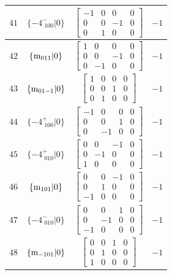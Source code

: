 \documentclass[fleqn,8pt]{jsarticle}
\begin{document}
\begin{longtable}{cccc}
$ 41 $ & $ \{-4^{-}_{\,\,100}|0\} $ & $ \begin{bmatrix} -1 & 0 & 0 & 0 \\ 0 & 0 & -1 & 0 \\ 0 & 1 & 0 & 0 \end{bmatrix} $ & $ -1 $ \\ \hline
$ 42 $ & $ \{{\rm m}_{011}|0\} $ & $ \begin{bmatrix} 1 & 0 & 0 & 0 \\ 0 & 0 & -1 & 0 \\ 0 & -1 & 0 & 0 \end{bmatrix} $ & $ -1 $ \\ \hline
$ 43 $ & $ \{{\rm m}_{01-1}|0\} $ & $ \begin{bmatrix} 1 & 0 & 0 & 0 \\ 0 & 0 & 1 & 0 \\ 0 & 1 & 0 & 0 \end{bmatrix} $ & $ -1 $ \\ \hline
$ 44 $ & $ \{-4^{+}_{\,\,100}|0\} $ & $ \begin{bmatrix} -1 & 0 & 0 & 0 \\ 0 & 0 & 1 & 0 \\ 0 & -1 & 0 & 0 \end{bmatrix} $ & $ -1 $ \\ \hline
$ 45 $ & $ \{-4^{+}_{\,\,010}|0\} $ & $ \begin{bmatrix} 0 & 0 & -1 & 0 \\ 0 & -1 & 0 & 0 \\ 1 & 0 & 0 & 0 \end{bmatrix} $ & $ -1 $ \\ \hline
$ 46 $ & $ \{{\rm m}_{101}|0\} $ & $ \begin{bmatrix} 0 & 0 & -1 & 0 \\ 0 & 1 & 0 & 0 \\ -1 & 0 & 0 & 0 \end{bmatrix} $ & $ -1 $ \\ \hline
$ 47 $ & $ \{-4^{-}_{\,\,010}|0\} $ & $ \begin{bmatrix} 0 & 0 & 1 & 0 \\ 0 & -1 & 0 & 0 \\ -1 & 0 & 0 & 0 \end{bmatrix} $ & $ -1 $ \\ \hline
$ 48 $ & $ \{{\rm m}_{-101}|0\} $ & $ \begin{bmatrix} 0 & 0 & 1 & 0 \\ 0 & 1 & 0 & 0 \\ 1 & 0 & 0 & 0 \end{bmatrix} $ & $ -1 $ \\
\end{longtable}
\end{document}
